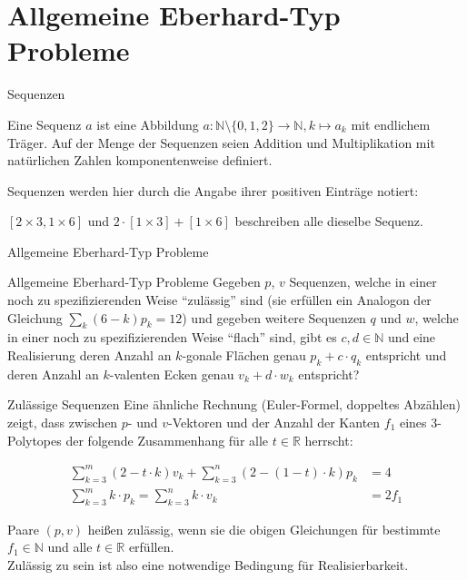 \documentclass[10pt, notheorems]{beamer}
\newcommand{\set}[1]{\{ #1 \}}
\newcommand{\nats}{\mathbb{N}}
\newcommand{\reals}{\mathbb{R}}
\newcommand{\hdef}[1]{\textcolor{darkred2}{#1}}
\begin{document}
\section{Allgemeine {\sc Eberhard}-Typ Probleme}
\begin{frame}{Sequenzen}
  \begin{definition}[Sequenz]
    Eine \hdef{Sequenz} $a$ ist eine Abbildung $a : \nats \setminus \set{0, 1, 2} \to \nats, k \mapsto a_k$ mit endlichem Träger. Auf der Menge der Sequenzen seien Addition und Multiplikation mit natürlichen Zahlen komponentenweise definiert.
  \end{definition}
  \pause
  Sequenzen werden hier durch die Angabe ihrer positiven Einträge notiert:
  \begin{example}
    $[2 \times 3, 1 \times 6]$ und $2 \cdot [1 \times 3] + [1 \times 6]$ beschreiben alle dieselbe Sequenz.
  \end{example}
\end{frame}
\begin{frame}{Allgemeine {\sc Eberhard}-Typ Probleme}
  \begin{block}{Allgemeine {\sc Eberhard}-Typ Probleme}
    Gegeben $p$, $v$ Sequenzen, welche in einer noch zu spezifizierenden Weise ``zulässig'' sind (sie erfüllen ein Analogon der Gleichung $\sum_k (6 - k) p_k = 12$) und gegeben weitere Sequenzen $q$ und $w$, welche in einer noch zu spezifizierenden Weise ``flach'' sind, gibt es $c, d \in \nats$ und eine Realisierung deren Anzahl an $k$-gonale Flächen genau $p_k + c \cdot q_k$ entspricht und deren Anzahl an $k$-valenten Ecken genau $v_k + d \cdot w_k$ entspricht?
  \end{block}
\end{frame}

\begin{frame}{Zulässige Sequenzen}
  Eine ähnliche Rechnung ({\sc Euler}-Formel, doppeltes Abzählen) zeigt, dass zwischen $p$- und $v$-Vektoren und der Anzahl der Kanten $f_1$ eines $3$-Polytopes der folgende Zusammenhang für alle $t \in \reals$ herrscht:
  \begin{block}{}
    \begin{align*}
      \sum_{k=3}^m (2 - t \cdot k ) v_k + \sum_{k=3}^n ( 2 - (1 - t) \cdot k ) p_k &= 4\\
      \sum_{k=3}^{m} k \cdot p_k = \sum_{k=3}^{n} k \cdot v_k &= 2f_1
    \end{align*}
  \end{block}
  Paare $(p, v)$ heißen \hdef{zulässig}, wenn sie die obigen Gleichungen für bestimmte $f_1 \in \nats$ und alle $t \in \reals$ erfüllen.\\
  Zulässig zu sein ist also eine notwendige Bedingung für Realisierbarkeit.
\end{frame}
\end{document}
